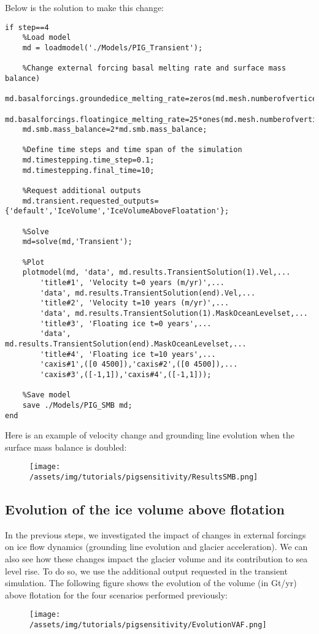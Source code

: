 Below is the solution to make this change:
\begin{verbatim}if step==4
	%Load model
	md = loadmodel('./Models/PIG_Transient');

	%Change external forcing basal melting rate and surface mass balance)
	md.basalforcings.groundedice_melting_rate=zeros(md.mesh.numberofvertices,1);
	md.basalforcings.floatingice_melting_rate=25*ones(md.mesh.numberofvertices,1);
	md.smb.mass_balance=2*md.smb.mass_balance;

	%Define time steps and time span of the simulation
	md.timestepping.time_step=0.1;
	md.timestepping.final_time=10;

	%Request additional outputs
	md.transient.requested_outputs={'default','IceVolume','IceVolumeAboveFloatation'};

	%Solve
	md=solve(md,'Transient');

	%Plot
	plotmodel(md, 'data', md.results.TransientSolution(1).Vel,...
		'title#1', 'Velocity t=0 years (m/yr)',...
		'data', md.results.TransientSolution(end).Vel,...
		'title#2', 'Velocity t=10 years (m/yr)',...
		'data', md.results.TransientSolution(1).MaskOceanLevelset,...
		'title#3', 'Floating ice t=0 years',...
		'data', md.results.TransientSolution(end).MaskOceanLevelset,...
		'title#4', 'Floating ice t=10 years',...
		'caxis#1',([0 4500]),'caxis#2',([0 4500]),...
		'caxis#3',([-1,1]),'caxis#4',([-1,1]));

	%Save model
	save ./Models/PIG_SMB md;
end\end{verbatim}

Here is an example of velocity change and grounding line evolution when the surface mass balance is doubled:
\begin{figure}[H]
	\begin{center}
		\texttt{[image: /assets/img/tutorials/pigsensitivity/ResultsSMB.png]}
	\end{center}
\end{figure}
\subsection{Evolution of the ice volume above flotation} %
In the previous steps, we investigated the impact of changes in external forcings on ice flow dynamics (grounding line evolution and glacier acceleration). We can also see how these changes impact the glacier volume and its contribution to sea level rise. To do so, we use the additional output \verb@IceVolumeAboveFloatation@ requested in the transient simulation. The following figure shows the evolution of the volume (in Gt/yr) above flotation for the four scenarios performed previously:
\begin{figure}[H]
	\begin{center}
		\texttt{[image: /assets/img/tutorials/pigsensitivity/EvolutionVAF.png]}
	\end{center}
\end{figure}
